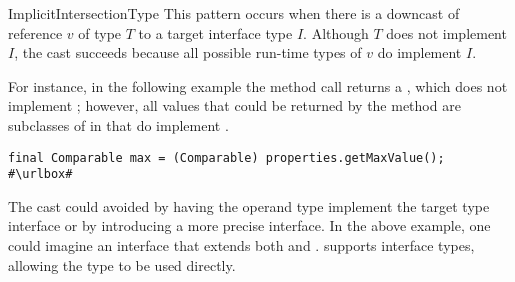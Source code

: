 \begin{pattern}{ImplicitIntersectionType}
This pattern occurs when there is a downcast of reference $v$ of type $T$ to a
target
interface type $I$.
Although $T$ does not implement $I$, 
the cast succeeds because all possible run-time types of $v$
do implement $I$.

\instances{}
For instance, in the following example%
\def\urlvar{http://bit.ly/senbox_org_snap_desktop_2FQOt4v}
the method call returns a , which does not implement
; however,
all values that could be returned by the method
are subclasses of  in 
that do implement .

\begin{verbatim}
final Comparable max = (Comparable) properties.getMaxValue();
#\urlbox#
\end{verbatim}



\discussion{}
The cast could avoided by having the operand type implement the target type
  interface or by introducing a more precise interface.
  In the above example, one could imagine an interface
   that extends both  and
  . \scala{} supports
  interface types, allowing 
  the type 
  to be used directly.

\end{pattern}
